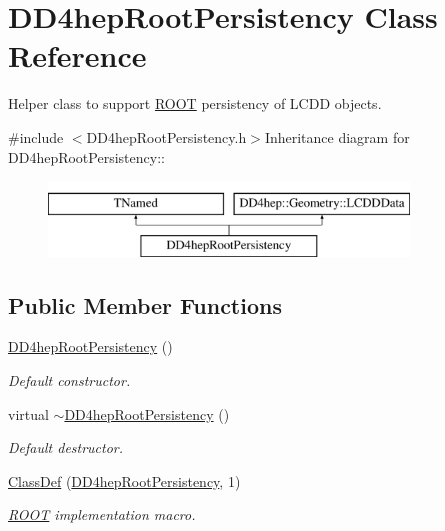 \hypertarget{class_d_d4hep_root_persistency}{
\section{DD4hepRootPersistency Class Reference}
\label{class_d_d4hep_root_persistency}
}


Helper class to support \hyperlink{namespace_r_o_o_t}{ROOT} persistency of LCDD objects.  


{\ttfamily \#include $<$DD4hepRootPersistency.h$>$}Inheritance diagram for DD4hepRootPersistency::\begin{figure}[H]
\begin{center}
\leavevmode
\includegraphics[height=2cm]{class_d_d4hep_root_persistency}
\end{center}
\end{figure}
\subsection*{Public Member Functions}
\begin{DoxyCompactItemize}
\item 
\hyperlink{class_d_d4hep_root_persistency_ac24a71ad3ca37110b7cb0b4f36abc300}{DD4hepRootPersistency} ()
\begin{DoxyCompactList}\small\item\em Default constructor. \item\end{DoxyCompactList}\item 
virtual \hyperlink{class_d_d4hep_root_persistency_a3abaa5bb63ce254a41b17df3d78fc005}{$\sim$DD4hepRootPersistency} ()
\begin{DoxyCompactList}\small\item\em Default destructor. \item\end{DoxyCompactList}\item 
\hyperlink{class_d_d4hep_root_persistency_af47b83fcc3468d2e8fca243d2cac8758}{ClassDef} (\hyperlink{class_d_d4hep_root_persistency}{DD4hepRootPersistency}, 1)
\begin{DoxyCompactList}\small\item\em \hyperlink{namespace_r_o_o_t}{ROOT} implementation macro. \item\end{DoxyCompactList}\end{DoxyCompactItemize}
